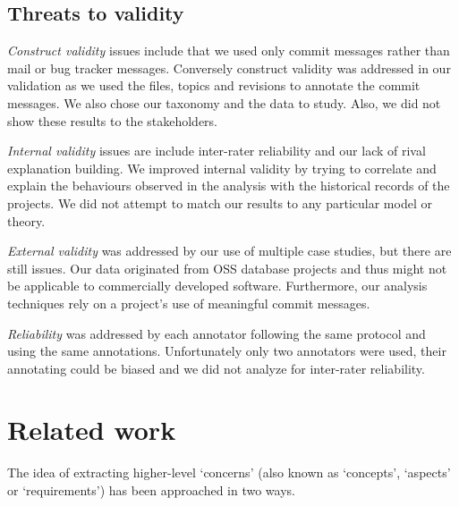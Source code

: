 \documentclass[]{sig-alternate}
\begin{document}
\subsection{Threats to validity}


\emph{Construct validity} issues include that we used only commit messages rather than mail or bug tracker messages. 
Conversely construct validity was addressed in our validation as we used the files, topics and revisions to annotate the commit messages.
We also chose our taxonomy and the data to study. Also, we did not show these results to the stakeholders.

\emph{Internal validity} issues are include inter-rater reliability and our lack of rival explanation building. 
We improved internal validity by trying to correlate and explain the behaviours observed in the analysis with the historical records of the projects.
We did not attempt to match our results to any particular model or theory.

\emph{External validity} was addressed by our use of multiple case studies, but there are still issues. 
Our data originated from OSS database projects and thus might not be applicable to commercially developed software. 
Furthermore, our analysis techniques rely on a project's use of meaningful commit messages. 

\emph{Reliability} was addressed by each annotator following the same protocol and using the same annotations. 
Unfortunately only two annotators were used, their annotating could be biased and we did not analyze for inter-rater reliability.


\section{Related work}
\label{sec:related}
The idea of extracting higher-level `concerns' (also known as `concepts', `aspects' or `requirements') has been approached in two ways. 
\end{document}
